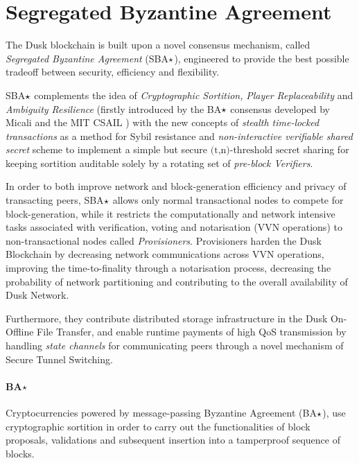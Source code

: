 \section{Segregated Byzantine Agreement}
\label{sec:SBA}

The \textrm{Dusk} blockchain is built upon a novel consensus mechanism, called \textit{Segregated Byzantine Agreement} (SBA$\large\star$), engineered to provide the best possible tradeoff between security, efficiency and flexibility. 

SBA$\large\star$ complements the idea of \textit{Cryptographic Sortition,} \textit{Player Replaceability} and \textit{Ambiguity Resilience} (firstly introduced by the BA$\large\star$ consensus developed by Micali and the MIT CSAIL \cite{algorand}) with the new concepts of \textit{stealth time-locked transactions} as a method for Sybil resistance and \textit{non-interactive verifiable shared secret} scheme to implement a simple but secure $\textrm{(t,n)-threshold secret}$ sharing for keeping sortition auditable solely by a rotating set of \textit{pre-block Verifiers}.

In order to both improve network and block-generation efficiency and privacy of transacting peers, SBA$\large\star$ allows only normal transactional nodes to compete for block-generation, while it restricts the computationally and network intensive tasks associated with verification, voting and notarisation (VVN operations) to non-transactional nodes called \textit{Provisioners}. Provisioners harden the \textrm{Dusk} Blockchain by decreasing network communications across VVN operations, improving the time-to-finality through a notarisation process, decreasing the probability of network partitioning and contributing to the overall availability of \textrm{Dusk} Network.

Furthermore, they contribute distributed storage infrastructure in the \textrm{Dusk} On- Offline File Transfer, and enable runtime payments of high QoS transmission by handling \textit{state channels} for communicating peers through a novel mechanism of Secure Tunnel Switching.

\paragraph{BA$\large\star$}

Cryptocurrencies powered by message-passing Byzantine Agreement (BA$\large\star$), use cryptographic sortition in order to carry out the functionalities of block proposals, validations and subsequent insertion into a tamperproof sequence of blocks.

